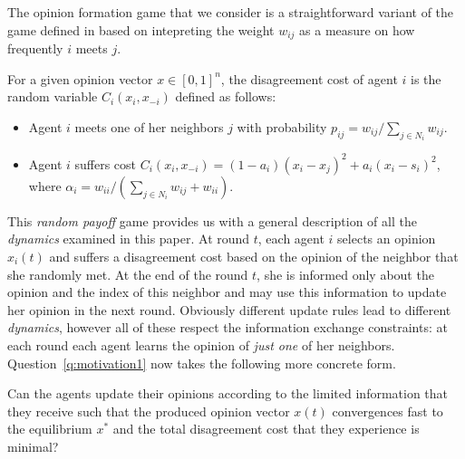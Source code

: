 The opinion formation game that we consider is a straightforward variant of the
game defined in \cite{BKO11} based on intepreting the weight $w_{ij}$ as a
measure on how frequently $i$ meets $j$.
\begin{definition}\label{d:random_game}
  For a given opinion vector $x \in [0,1]^n$, the disagreement cost of agent
  $i$ is the random variable $C_i(x_i,x_{-i})$ defined as follows:
  \begin{itemize}
    \item Agent $i$ meets one of her neighbors $j$ with probability $p_{ij}=
      w_{ij}/\sum_{j\in N_i}w_{ij}$.
    \item Agent $i$ suffers cost $C_i(x_i , x_{-i}) = (1-a_i)(x_i-x_j)^2 +
      a_i(x_i-s_i)^2$, where $\alpha_i = w_{ii}/(\sum_{j\in
        N_i}w_{ij}+w_{ii})$.
  \end{itemize}
\end{definition} This \emph{random payoff} game provides us with a general
description of all the \emph{dynamics} examined in this paper. At round $t$,
each agent $i$ selects an opinion $x_i(t)$ and suffers a disagreement cost
based on the opinion of the neighbor that she randomly met.  At the end of the
round $t$, she is informed only about the opinion and the index of this
neighbor and may use this information to update her opinion in the next round.
Obviously different update rules lead to different \emph{dynamics}, however all
of these respect the information exchange constraints: at each round each agent
learns the opinion of \emph{just one} of her neighbors.
Question~\ref{q:motivation1} now takes the following more concrete form.

\begin{question}\label{q:motivation2}
  Can the agents update their opinions according to the limited information
  that they receive such that the produced opinion vector $x(t)$ convergences
  fast to the equilibrium $x^*$ and the total disagreement cost that they
  experience is minimal?  \end{question}


